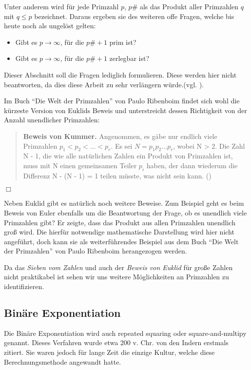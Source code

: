 \documentclass[12pt,a4paper]{article}
\theoremstyle{definition}
\begin{document}
Unter anderem wird für jede Primzahl $p$, $p\#$ als das Produkt aller Primzahlen $q$ mit $q \leq p$ bezeichnet. 
Daraus ergeben sie des weiteren offe Fragen, welche bis heute noch als ungelöst gelten:
\begin{itemize}
    \item Gibt es $p \to \infty$, für die $p\# +1$ prim ist?
    \item Gibt es $p \to \infty$, für die $p\# +1$ zerlegbar ist?
\end{itemize}
Dieser Abschnitt soll die Fragen lediglich formulieren.
Diese werden hier nicht beantworten, da dies diese Arbeit zu sehr verlängern würde.(vgl. \cite[4]{Ribenboim2006}).

Im Buch “Die Welt der Primzahlen” von Paulo Ribenboim findet sich wohl die kürzeste Version von Euklids Beweis und unterstreicht dessen Richtigkeit von der Anzahl unendlicher Primzahlen:

\begin{quote}
\small
\textbf{Beweis von Kummer.} Angenommen, es gäbe nur endlich viele Primzahlen $p_1 < p_2 <...< p_r$.
Es sei $N = p_1p_2...p_r$, wobei N > 2.
Die Zahl N - 1, die wie alle natürlichen Zahlen ein Produkt von Primzahlen ist, muss mit N einen gemeinsamen Teiler $p_i$ haben, der dann wiederum die Differenz N - (N - 1) = 1 teilen müsste, was nicht sein kann. (\cite[4]{Ribenboim2006})
\end{quote}
\begin{flushright}
$\Box$
\end{flushright}

Neben Euklid gibt es natürlich noch weitere Beweise.
Zum Beispiel geht es beim Beweis von Euler ebenfalls um die Beantwortung der Frage, ob es unendlich viele Primzahlen gibt?
Er zeigte, dass das Produkt aus allen Primzahlen unendlich groß wird.
Die hierfür notwendige mathematische Darstellung wird hier nicht angeführt, doch kann sie als weiterführendes Beispiel aus dem Buch “Die Welt der Primzahlen” von Paulo Ribenboim herangezogen werden.

Da das \textit{Sieben vom Zahlen} und auch der \textit{Beweis von Euklid} für große Zahlen nicht praktikabel ist sehen wir uns weitere Möglichkeiten an Primzahlen zu identifizieren.

\subsection{Binäre Exponentiation}
Die Binäre Exponentiation wird auch repeated squaring oder square-and-multipy genannt.
Dieses Verfahren wurde etwa 200 v. Chr. von den Indern erstmals zitiert.
Sie waren jedoch für lange Zeit die einzige Kultur, welche diese Berechnungsmethode angewandt hatte.
\end{document}
